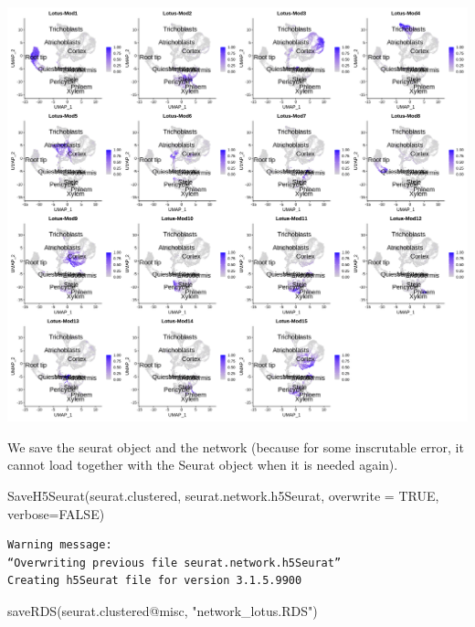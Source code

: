 \documentclass[
  letterpaper,
  DIV=11,
  numbers=noendperiod]{scrartcl}
\newenvironment{Shaded}{}{}
\newcommand{\AttributeTok}[1]{\textcolor[rgb]{0.49,0.56,0.16}{#1}}
\newcommand{\ConstantTok}[1]{\textcolor[rgb]{0.53,0.00,0.00}{#1}}
\newcommand{\FunctionTok}[1]{\textcolor[rgb]{0.02,0.16,0.49}{#1}}
\newcommand{\NormalTok}[1]{#1}
\newcommand{\SpecialCharTok}[1]{\textcolor[rgb]{0.25,0.44,0.63}{#1}}
\newcommand{\StringTok}[1]{\textcolor[rgb]{0.25,0.44,0.63}{#1}}
\begin{document}
\includegraphics{tutorial-2024_files/figure-pdf/cell-135-output-3.png}

We save the seurat object and the network (because for some inscrutable
error, it cannot load together with the Seurat object when it is needed
again).

\begin{Shaded}
\begin{Highlighting}[]
\FunctionTok{SaveH5Seurat}\NormalTok{(seurat.clustered, }\StringTok{\textquotesingle{}seurat.network.h5Seurat\textquotesingle{}}\NormalTok{, }\AttributeTok{overwrite =} \ConstantTok{TRUE}\NormalTok{, }\AttributeTok{verbose=}\ConstantTok{FALSE}\NormalTok{)}
\end{Highlighting}
\end{Shaded}

\begin{verbatim}
Warning message:
“Overwriting previous file seurat.network.h5Seurat”
Creating h5Seurat file for version 3.1.5.9900
\end{verbatim}

\begin{Shaded}
\begin{Highlighting}[]
\FunctionTok{saveRDS}\NormalTok{(seurat.clustered}\SpecialCharTok{@}\NormalTok{misc, }\StringTok{"network\_lotus.RDS"}\NormalTok{)}
\end{Highlighting}
\end{Shaded}
\end{document}
